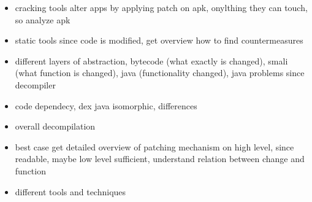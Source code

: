 \begin{itemize}
  \item cracking tools alter apps by applying patch on apk, onylthing they can touch, so analyze apk
  \item static tools since code is modified, get overview how to find countermeasures
  \item different layers of abstraction, bytecode (what exactly is changed), smali (what function is changed), java (functionality changed), java problems since decompiler
  \item code dependecy, dex java isomorphic, differences
  \item overall decompilation
  \item best case get detailed overview of patching mechanism on high level, since readable, maybe low level sufficient, understand relation between change and function
  \item different tools and techniques
\end{itemize}
